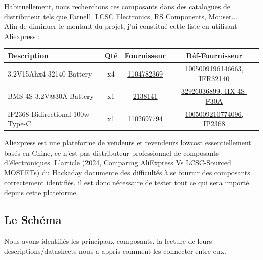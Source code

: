 \documentclass[a4paper,11pt]{article}
\newcommand{\LiFePoFour}[0]{\ce{LiFePO_4}}
\begin{document}
\begin{blogmain}
Habituellement, nous recherchons ces composants dans des catalogues de distributeur tels que \href{https://fr.farnell.com/}{Farnell}, \href{https://www.lcsc.com}{LCSC Electronics}, \href{https://fr.rs-online.com/web/}{RS Components}, \href{https://eu.mouser.com/}{Mouser}...
\\
Afin de diminuer le montant du projet, j'ai constitué cette liste en utilisant \href{https://fr.aliexpress.com/}{Aliexpress} :

\begin{table}[htb]
  \centering
  \begin{tabular}{|l|c|c|c|}
    \hline \bf Description& \bf Qté& \bf Fournisseur& \bf Réf-Fournisseur \\ \hline
  
    3.2V15Ahx4 32140 \LiFePoFour{} Battery & x4 & \href{https://www.aliexpress.com/store/1104782369}{1104782369} & \href{https://fr.aliexpress.com/item/1005009196146663.html}{1005009196146663, IFR32140} \\
    BMS 4S 3.2V@30A \LiFePoFour{} Battery & x1 & \href{https://www.aliexpress.com/store/2138141}{2138141} & \href{https://fr.aliexpress.com/item/32926036899.html}{32926036899, HX-4S-F30A} \\
    IP2368 Bidirectional 100w Type-C & x1 & \href{https://www.aliexpress.com/store/1102697794}{1102697794} & \href{https://fr.aliexpress.com/item/1005009210774096.html}{1005009210774096, IP2368} \\
    \hline
  \end{tabular}
\end{table}

\href{https://fr.aliexpress.com/}{Aliexpress} est une plateforme de vendeurs et revendeurs lowcost essentiellement basés en Chine, ce n'est pas distributeur professionnel de composants d'électroniques. L'article \href{https://hackaday.com/2024/08/24/comparing-aliexpress-vs-lcsc-sourced-mosfets}{(2024, Comparing AliExpress Vs LCSC-Sourced MOSFETs)} du \href{https://hackaday.com}{Hackaday} documente des difficultés à se fournir des composants correctement identifiés, il est donc nécessaire de tester tout ce qui sera importé depuis cette plateforme.

\subsection{Le Schéma}
Nous avons identifiés les principaux composants, la lecture de leurs descriptions/datasheets nous a appris comment les connecter entre eux.


\end{blogmain}
\end{document}
